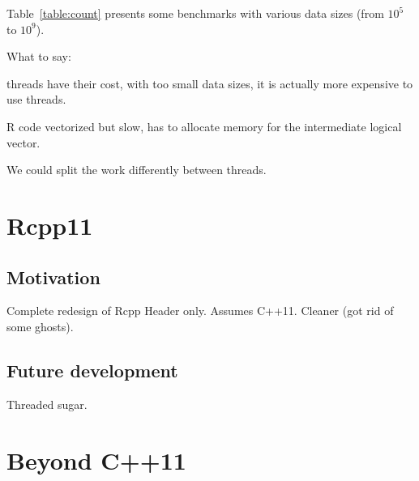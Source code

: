 Table~\ref{table:count} presents some benchmarks with various 
data sizes (from $10^5$ to $ 10^9$). 

What to say: 

threads have their cost, with too small data sizes, it is actually more
expensive to use threads. 

R code vectorized but slow, has to allocate memory for the intermediate 
logical vector. 

We could split the work differently between threads. 

\section{Rcpp11}

\subsection{Motivation}

Complete redesign of Rcpp
Header only. Assumes C++11.
Cleaner (got rid of some ghosts). 

\subsection{Future development}

Threaded sugar. 

\section{Beyond C++11}



\address{Romain François\\
    R Enthusiasts\\
    1 place de l'égalité. 42400 Saint Chamond\\
    FRANCE }
    

